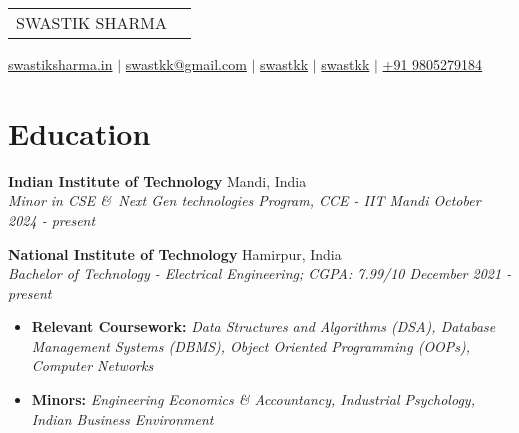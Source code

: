 \documentclass[a4,10pt]{article}
\begin{document}
\pagestyle{empty} 

\begin{tabularx}{\linewidth}{@{} l X @{}}
\Huge {SWASTIK SHARMA} & \hfill 
\end{tabularx}

\begin{flushleft}
\href{https://www.swastiksharma.in}{\raisebox{-0.05\height}{\faGlobe} swastiksharma.in} $|$ 
\href{mailto:swastkk@gmail.com}{\raisebox{-0.05\height}{\faEnvelope} swastkk@gmail.com} $|$ 
\href{https://github.com/swastkk}{\raisebox{-0.05\height}{\faGithub} swastkk} $|$ 
\href{https://linkedin.com/in/swastkk}{\raisebox{-0.05\height}{\faLinkedin} swastkk} $|$ 
\href{tel:+919805279184}{\raisebox{-0.05\height}{\faMobile} +91 9805279184}

\end{flushleft}


\section{Education}
\textbf{Indian Institute of Technology}  \hfill {Mandi, India}  \\
    \textit{{Minor in CSE \&\ Next Gen technologies Program, CCE - IIT Mandi} \hfill {October 2024 - present}}
    
 \textbf{National Institute of Technology}  \hfill {Hamirpur, India}  \\
    \textit{{Bachelor of Technology - Electrical Engineering; CGPA: 7.99/10} \hfill {December 2021 - present}}
    \begin{itemize}[leftmargin=*,label=$\diamond$]
        \item \small \textbf{Relevant Coursework:} \textit{Data Structures and Algorithms (DSA), Database Management Systems (DBMS), Object Oriented Programming (OOPs),  Computer Networks}
         \item \small \textbf{Minors:} \textit{Engineering Economics \& Accountancy, Industrial Psychology, Indian Business Environment}
    \end{itemize}
\end{document}
